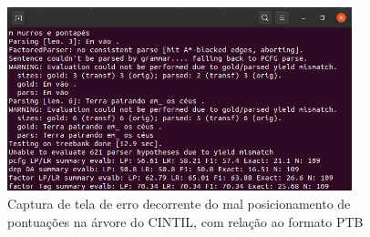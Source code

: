 \begin{figure}[!h]
    \centering
    \includegraphics[width=100mm,scale=1.5]{imagens/cintil_training_error.png}
    \caption[Erro decorrente do mal posicionamento de pontuações na árvore do CINTIL]{Captura de tela de erro decorrente do mal posicionamento de pontuações na árvore do CINTIL, com relação ao formato PTB}
    \label{fig:cintil_training_error}
\end{figure}